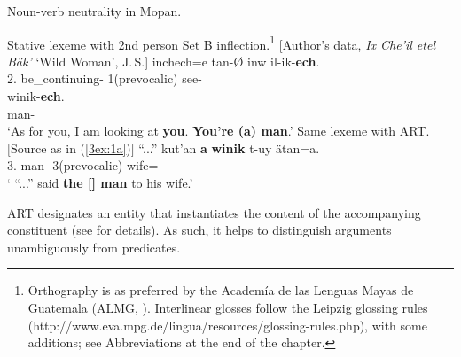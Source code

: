 \documentclass[output=paper]{langsci/langscibook}
\begin{document}
\begin{exe}
\ex\label{3ex:1}
Noun-verb neutrality in Mopan.
	\begin{xlista}
	\ex\label{3ex:1a}
	Stative lexeme with 2nd person Set B inflection.\footnote{Orthography is as preferred by the Academ\'ia de las Lenguas Mayas de Guatemala (ALMG, \citealt{england:elliott:90}). Interlinear glosses follow the Leipzig glossing rules (http://www.eva.mpg.de/lingua/resources/glossing-rules.php), with some additions; see Abbreviations at the end of the chapter.}\newline 
	[Author's data, {\emph{Ix Che'il etel B\"ak'}} `Wild Woman', J.\,S.]
	\exi{}
	\gll	inchech=e 		tan-{\O}				inw				il-ik-{\bf{ech}}. \\
		2.{}	be\_continuing-{}	1{}(prevocalic)	see-{} \\
	\glt
	\exi{}
	\gll	winik-{\bf{ech}}. \\
		man-{\bf{{}}} \\
	\glt `As for you, I am looking at {\bf{you}}. {\bf{You're (a) man}}.'
	\ex\label{3ex:1b}
	Same lexeme with ART. \\
	$\lbrack$Source as in (\ref{3ex:1a})$\rbrack$
	\exi{}
	\gll ``...''	kut'an		{\bf{a}}	{\bf{winik}}		t-uy						\"atan=a. \\
		{}	3.{}	{}		man			{}-3{}(prevocalic)	wife={} \\
	\glt ` ``...'' said {\bf{the [{}] man}} to his wife.'
	\end{xlista}
\end{exe}

ART designates an entity that instantiates the content of the accompanying constituent (see \citealt{contini:morava:danziger:fc} for details). As such, it helps to distinguish arguments unambiguously from predicates.
\end{document}
